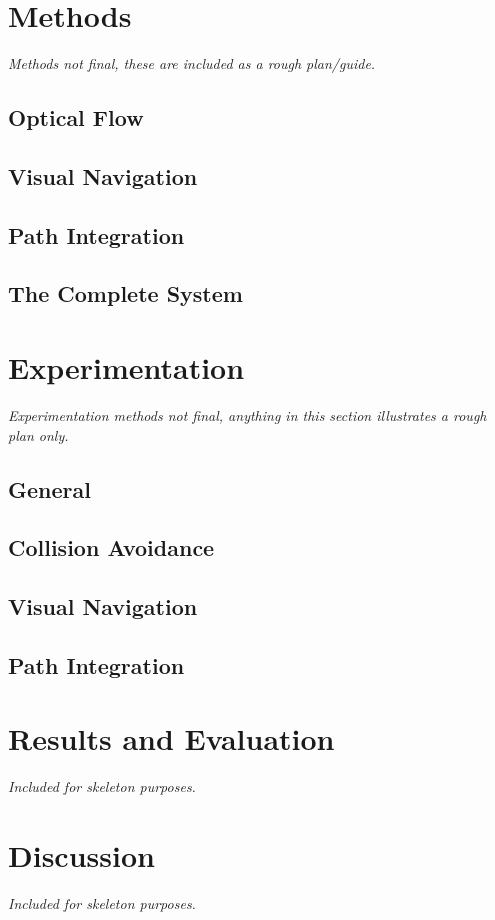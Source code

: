 \documentclass[a4paper,11pt,twoside,openright]{article}
\let\oldsection\section
\def\section{\cleardoublepage\oldsection}
\begin{document}
\section{ Methods } \label{sec:methods}
\textit{
  Methods not final, these are included as a rough plan/guide.
  }
\subsection{ Optical Flow }
\subsection{ Visual Navigation }
\subsection{ Path Integration }
\subsection{ The Complete System}

\section{Experimentation}\label{sec:test}
\textit{
  Experimentation methods not final, anything in this section illustrates a
  rough plan only.
}
\subsection{General}
\subsection{Collision Avoidance}
\subsection{Visual Navigation}
\subsection{Path Integration}
\newpage

\section{ Results and Evaluation } \label{sec:results}
\textit{Included for skeleton purposes.}
\newpage

\section{ Discussion }
\textit{Included for skeleton purposes.}
\newpage



\end{document}
